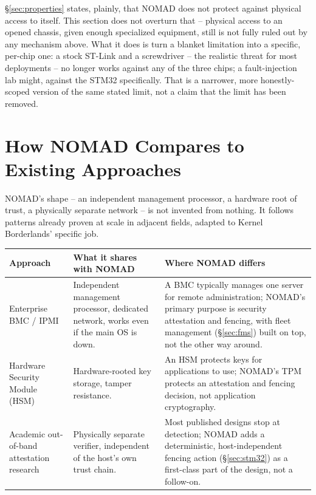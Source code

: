 \documentclass[11pt,a4paper]{article}
\begin{document}
\S\ref{sec:properties} states, plainly, that NOMAD does not protect
against physical access to itself. This section does not overturn that
-- physical access to an opened chassis, given enough specialized
equipment, still is not fully ruled out by any mechanism above. What it
does is turn a blanket limitation into a specific, per-chip one: a
stock ST-Link and a screwdriver -- the realistic threat for most
deployments -- no longer works against any of the three chips; a
fault-injection lab might, against the STM32 specifically. That is a
narrower, more honestly-scoped version of the same stated limit, not a
claim that the limit has been removed.

\section{How NOMAD Compares to Existing Approaches}
\label{sec:comparison}

NOMAD's shape -- an independent management processor, a hardware root of
trust, a physically separate network -- is not invented from nothing.
It follows patterns already proven at scale in adjacent fields, adapted
to Kernel Borderlands' specific job.

\begin{center}
\renewcommand{\arraystretch}{1.4}
\small
\begin{tabular}{@{}p{3.4cm}p{5.2cm}p{5.0cm}@{}}
\toprule
\textbf{Approach} & \textbf{What it shares with NOMAD} & \textbf{Where NOMAD differs} \\
\midrule
Enterprise BMC / IPMI~\cite{dmtfipmi} & Independent management processor, dedicated
network, works even if the main OS is down. & A BMC typically manages
one server for remote administration; NOMAD's primary purpose is
security attestation and fencing, with fleet management
(\S\ref{sec:fms}) built on top, not the other way around. \\
Hardware Security Module (HSM)~\cite{fips140} & Hardware-rooted key storage, tamper
resistance. & An HSM protects keys for applications to use; NOMAD's TPM
protects an attestation and fencing decision, not application
cryptography. \\
Academic out-of-band attestation research & Physically separate
verifier, independent of the host's own trust chain. & Most published
designs stop at detection; NOMAD adds a deterministic, host-independent
fencing action (\S\ref{sec:stm32}) as a first-class part of the
design, not a follow-on. \\
\bottomrule
\end{tabular}
\end{center}
\end{document}
